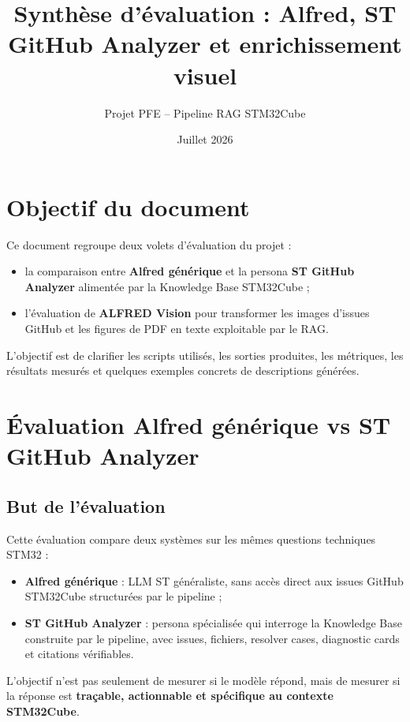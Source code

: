 \documentclass[11pt,a4paper]{article}
\title{Synthèse d'évaluation : Alfred, ST GitHub Analyzer et enrichissement visuel}
\author{Projet PFE -- Pipeline RAG STM32Cube}
\date{Juillet 2026}
\begin{document}
\maketitle

\section*{Objectif du document}

Ce document regroupe deux volets d'évaluation du projet :

\begin{itemize}
  \item la comparaison entre \textbf{Alfred générique} et la persona \textbf{ST GitHub Analyzer} alimentée par la Knowledge Base STM32Cube ;
  \item l'évaluation de \textbf{ALFRED Vision} pour transformer les images d'issues GitHub et les figures de PDF en texte exploitable par le RAG.
\end{itemize}

L'objectif est de clarifier les scripts utilisés, les sorties produites, les métriques, les résultats mesurés et quelques exemples concrets de descriptions générées.

\section{Évaluation Alfred générique vs ST GitHub Analyzer}

\subsection{But de l'évaluation}

Cette évaluation compare deux systèmes sur les mêmes questions techniques STM32 :

\begin{itemize}
  \item \textbf{Alfred générique} : LLM ST généraliste, sans accès direct aux issues GitHub STM32Cube structurées par le pipeline ;
  \item \textbf{ST GitHub Analyzer} : persona spécialisée qui interroge la Knowledge Base construite par le pipeline, avec issues, fichiers, resolver cases, diagnostic cards et citations vérifiables.
\end{itemize}

L'objectif n'est pas seulement de mesurer si le modèle répond, mais de mesurer si la réponse est \textbf{traçable, actionnable et spécifique au contexte STM32Cube}.
\end{document}
